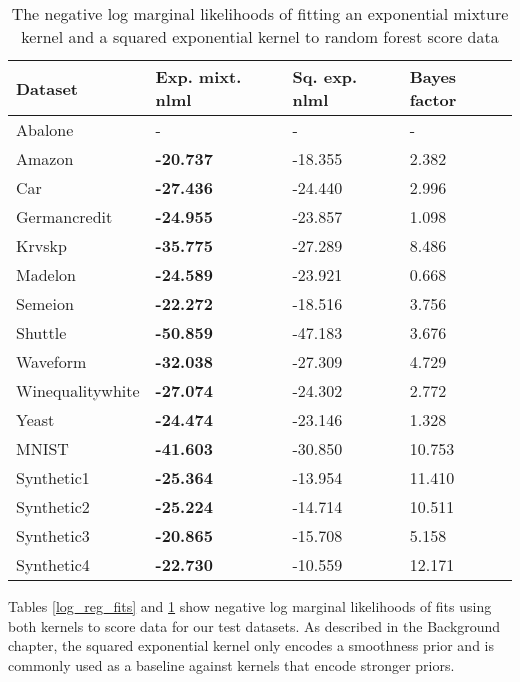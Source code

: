 \documentclass[a4paper,12pt,twoside,openright]{report}
\begin{document}
\begin{table}[t]
\centering
\begin{tabular}{|l|l|l|l|}
\hline
Dataset          & Exp. mixt. nlml & Sq. exp. nlml & Bayes factor \\ \hline\hline
Abalone          & -                 & -       & -              \\ \hline
Amazon           & \textbf{-20.737}  & -18.355 & 2.382          \\ \hline
Car              & \textbf{-27.436}  & -24.440 & 2.996          \\ \hline
Germancredit     & \textbf{-24.955}  & -23.857 & 1.098          \\ \hline
Krvskp           & \textbf{-35.775}  & -27.289 & 8.486          \\ \hline
Madelon          & \textbf{-24.589}  & -23.921 & 0.668          \\ \hline
Semeion          & \textbf{-22.272}  & -18.516 & 3.756          \\ \hline
Shuttle          & \textbf{-50.859}  & -47.183 & 3.676          \\ \hline
Waveform         & \textbf{-32.038}  & -27.309 & 4.729          \\ \hline
Winequalitywhite & \textbf{-27.074}  & -24.302 & 2.772          \\ \hline
Yeast            & \textbf{-24.474}  & -23.146 & 1.328          \\ \hline\hline
MNIST            & \textbf{-41.603}  & -30.850 & 10.753         \\ \hline
Synthetic1       & \textbf{-25.364}  & -13.954 & 11.410          \\ \hline
Synthetic2       & \textbf{-25.224}  & -14.714 & 10.511         \\ \hline
Synthetic3       & \textbf{-20.865}  & -15.708 & 5.158          \\ \hline
Synthetic4       & \textbf{-22.730}   & -10.559 & 12.171         \\ \hline
\end{tabular}
	\caption{The negative log marginal likelihoods of fitting an exponential mixture kernel and a squared exponential kernel to random forest score data}
\label{rnd_forest_fits}
\end{table}

Tables \ref{log_reg_fits} and \ref{rnd_forest_fits} show negative log marginal likelihoods of fits using both kernels to score data for our test datasets. As described in the Background chapter, the squared exponential kernel only encodes a smoothness prior and is commonly used as a baseline against kernels that encode stronger priors.
\end{document}
